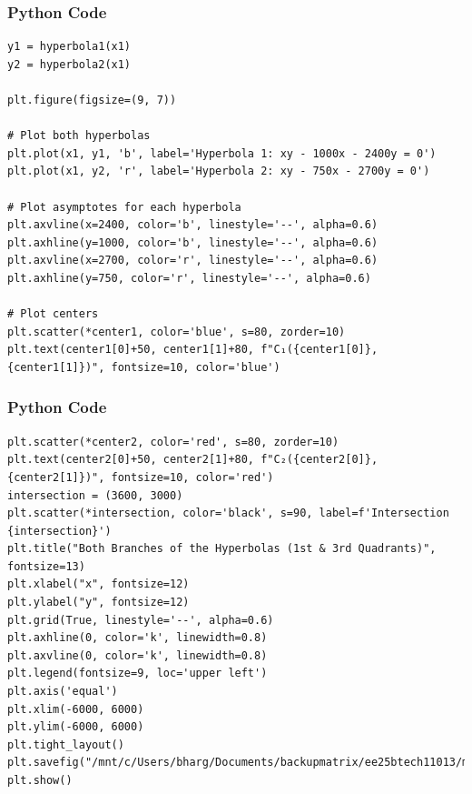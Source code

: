 \documentclass{beamer}
\begin{document}
\begin{frame}[fragile]
    \frametitle{Python Code}
    \begin{lstlisting}
y1 = hyperbola1(x1)
y2 = hyperbola2(x1)

plt.figure(figsize=(9, 7))

# Plot both hyperbolas
plt.plot(x1, y1, 'b', label='Hyperbola 1: xy - 1000x - 2400y = 0')
plt.plot(x1, y2, 'r', label='Hyperbola 2: xy - 750x - 2700y = 0')

# Plot asymptotes for each hyperbola
plt.axvline(x=2400, color='b', linestyle='--', alpha=0.6)
plt.axhline(y=1000, color='b', linestyle='--', alpha=0.6)
plt.axvline(x=2700, color='r', linestyle='--', alpha=0.6)
plt.axhline(y=750, color='r', linestyle='--', alpha=0.6)

# Plot centers
plt.scatter(*center1, color='blue', s=80, zorder=10)
plt.text(center1[0]+50, center1[1]+80, f"C₁({center1[0]}, {center1[1]})", fontsize=10, color='blue')

    \end{lstlisting}
\end{frame}
\begin{frame}[fragile]
    \frametitle{Python Code}
    \begin{lstlisting}
plt.scatter(*center2, color='red', s=80, zorder=10)
plt.text(center2[0]+50, center2[1]+80, f"C₂({center2[0]}, {center2[1]})", fontsize=10, color='red')
intersection = (3600, 3000)
plt.scatter(*intersection, color='black', s=90, label=f'Intersection {intersection}')
plt.title("Both Branches of the Hyperbolas (1st & 3rd Quadrants)", fontsize=13)
plt.xlabel("x", fontsize=12)
plt.ylabel("y", fontsize=12)
plt.grid(True, linestyle='--', alpha=0.6)
plt.axhline(0, color='k', linewidth=0.8)
plt.axvline(0, color='k', linewidth=0.8)
plt.legend(fontsize=9, loc='upper left')
plt.axis('equal')
plt.xlim(-6000, 6000)
plt.ylim(-6000, 6000)
plt.tight_layout()
plt.savefig("/mnt/c/Users/bharg/Documents/backupmatrix/ee25btech11013/matgeo/12.27/figs/Figure_1.png")
plt.show()




    \end{lstlisting}
\end{frame}
\end{document}
